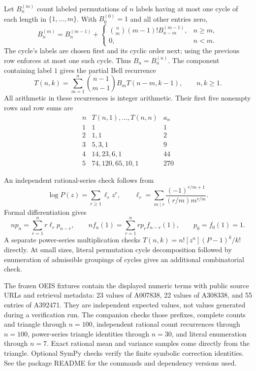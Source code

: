 \documentclass[11pt,letterpaper]{article}
\numberwithin{equation}{section}
\theoremstyle{remark}\newtheorem{remark}[theorem]{Remark}
\theoremstyle{definition}\newtheorem{definition}[theorem]{Definition}\theoremstyle{plain}
\begin{document}
Let $B_n^{(m)}$ count labeled permutations of $n$ labels having at
most one cycle of each length in $\{1,\ldots,m\}$. With
$B_0^{(0)}=1$ and all other entries zero,
\begin{equation}\label{ncy:eq:integercycle}
 B_n^{(m)}=B_n^{(m-1)}+
 \begin{cases}
  \binom nm(m-1)!B_{n-m}^{(m-1)},& n\geq m,\\
  0,&n<m.
 \end{cases}
\end{equation}
The cycle's labels are chosen first and its cyclic order next; using
the previous row enforces at most one such cycle. Thus $B_n=B_n^{(n)}$.
The component containing label $1$ gives the partial Bell recurrence
\begin{equation}\label{ncy:eq:bell}
 T(n,k)=\sum_{m=1}^n\binom{n-1}{m-1}B_mT(n-m,k-1),
 \qquad n,k\geq1.
\end{equation}
All arithmetic in these recurrences is integer arithmetic. Their
first five nonempty rows and row sums are
\[
\begin{array}{c|l|r}
 n&T(n,1),\ldots,T(n,n)&a_n\\\hline
 1&1&1\\
 2&1,1&2\\
 3&5,3,1&9\\
 4&14,23,6,1&44\\
 5&74,120,65,10,1&270
\end{array}
\]

An independent rational-series check follows from
\[
 \log P(z)=\sum_{r\geq1}\ell_rz^r,\qquad
 \ell_r=\sum_{m\mid r}\frac{(-1)^{r/m+1}}{(r/m)m^{r/m}}.
\]
Formal differentiation gives
\begin{equation}\label{ncy:eq:rational}
 np_n=\sum_{r=1}^n r\ell_rp_{n-r},\qquad
 nf_n(1)=\sum_{r=1}^n rp_rf_{n-r}(1),\qquad p_0=f_0(1)=1.
\end{equation}
A separate power-series multiplication checks
$T(n,k)=n![z^n](P-1)^k/k!$ directly. At small sizes, literal
permutation cycle decomposition followed by enumeration of admissible
groupings of cycles gives an additional combinatorial check.

The frozen OEIS fixtures contain the displayed numeric terms with
public source URLs and retrieval metadata: 23 values of A007838,
22 values of A308338, and 55 entries of A392471. They are independent
expected values, not values generated during a verification run.
The companion checks those prefixes, complete counts and triangle
through $n=100$, independent rational count recurrences through
$n=100$, power-series triangle identities through $n=30$, and literal
enumeration through $n=7$. Exact rational mean and variance samples
come directly from the triangle. Optional SymPy checks verify the
finite symbolic correction identities. See the package README for
the commands and dependency versions used.
\end{document}

